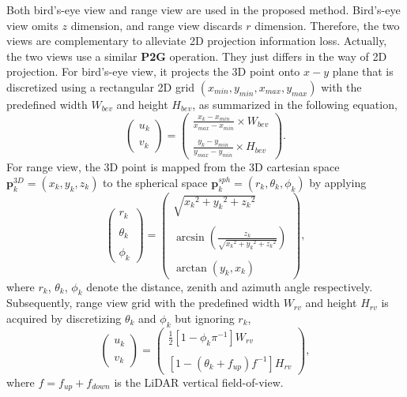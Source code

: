 \documentclass[letterpaper, 10 pt, conference]{ieeeconf}
\begin{document}
Both bird’s-eye view and range view are used in the proposed method. Bird’s-eye view omits $z$ dimension, and range view discards $r$ dimension. Therefore, the two views are complementary to alleviate 2D projection information loss. Actually, the two views use a similar {\bf P2G} operation. They just differs in the way of 2D projection. For bird’s-eye view, it projects the 3D point onto $x-y$ plane that is discretized using a rectangular 2D grid
$(x_{min}, y_{min}, x_{max}, y_{max})$ with the predefined width $W_{bev}$ and height $H_{bev}$, as summarized in the following equation,
\begin{equation}
\begin{pmatrix}
u_k \\ \\ v_k
\end{pmatrix}=
\begin{pmatrix}
\frac{x_k - x_{min}}{x_{max} - x_{min}} \times W_{bev} \\ \\
\frac{y_k - y_{min}}{y_{max} - y_{min}} \times H_{bev}
\end{pmatrix}.
\end{equation}
For range view, the 3D point is mapped from the 3D cartesian space $\boldsymbol{p}_k^{3D} = (x_k,y_k,z_k)$ to the spherical space $\boldsymbol{p}_k^{sph}=(r_k,\theta_k,\phi_k)$ by applying
\begin{equation}
\begin{pmatrix}
r_k \\ \\ \theta_k \\ \\ \phi_k
\end{pmatrix}=
\begin{pmatrix}
\sqrt{{x_k}^2 + {y_k}^2 + {z_k}^2} \\ \\
\arcsin{(\frac{z_k}{\sqrt{{x_k}^2 + {y_k}^2 + {z_k}^2}})} \\ \\
\arctan{(y_k, x_k)}
\end{pmatrix},
\end{equation}
where $r_k$, $\theta_k$, $\phi_k$ denote the distance, zenith and azimuth angle respectively. Subsequently, range view grid with the predefined width $W_{rv}$ and height $H_{rv}$ is acquired by discretizing $\theta_k$ and $\phi_k$ but ignoring $r_k$,
\begin{equation}
\begin{pmatrix}
u_k \\ \\ v_k
\end{pmatrix}=
\begin{pmatrix}
\frac{1}{2}[1 - \phi_k\pi^{-1}]W_{rv} \\ \\
[1-(\theta_k+f_{up})f^{-1}]H_{rv}
\end{pmatrix},
\end{equation}
where $f=f_{up} + f_{down}$ is the LiDAR vertical field-of-view.
\end{document}
